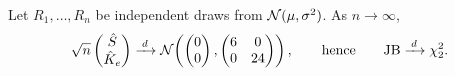\begin{chapterrefs}
\begin{proposition}\label{prop:jb}
Let $R_1,\dots,R_n$ be independent draws from $\mathcal{N}(\mu,\sigma^2)$. As $n\to\infty$,
\begin{equation}\label{eq:jbclt}
  \sqrt n\begin{pmatrix}\hat S\\ \hat K_e\end{pmatrix} \xrightarrow{\;d\;}
  \mathcal{N}\!\left(\begin{pmatrix}0\\0\end{pmatrix},\begin{pmatrix}6&0\\0&24\end{pmatrix}\right),
  \qquad\text{hence}\qquad \mathrm{JB}\xrightarrow{\;d\;}\chi^2_2 .
\end{equation}
\end{proposition}


\end{chapterrefs}
